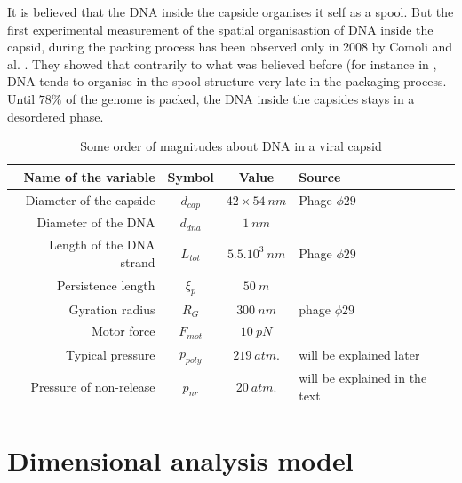 \documentclass{article}
\begin{document}
It is believed that the DNA inside the capside organises it self as a spool. But the first experimental measurement of the spatial organisastion of DNA inside the capsid, during the packing process has been observed only in 2008 by Comoli and al. \cite{comoli2008}. They showed that contrarily to what was believed before (for instance in \cite{phillips2005, prohit2005}, DNA tends to organise in the spool structure very late in the packaging process. Until $78\%$ of the genome is packed, the DNA inside the capsides stays in a desordered phase.

\begin{table}[h]
    \centering
    \begin{tabular}{|| r | c | c | l ||}
        \hline \hline
        \textbf{Name of the variable} & \textbf{Symbol} & \textbf{Value} & \textbf{Source} \\
        \hline \hline
        Diameter of the capside  & $d_{cap}$   & $42\times 54~nm$ & Phage $\phi29$ \cite{tao1998}  \\
        Diameter of the DNA    & $ d_{dna}$  & $1~nm$           & \cite{phillips2005} \\
        Length of the DNA strand & $ L_{tot}$  & $5.5.10^{3}~nm$  & Phage $\phi29$ \cite{tao1998} \\
        Persistence length       & $ \xi_p $   & $50~m$           & \cite{smith2001} \\
        Gyration radius          & $ R_{G} $     & $300~nm$         & phage $\phi29$ \cite{phillips2005} \\
        Motor force              & $ F_{mot}$  & $10~pN$          & \cite{phillips2005} \\
        Typical pressure         & $ p_{poly}$ & $219~atm.$       & will be explained later \\
        Pressure of non-release  & $ p_{nr} $  & $20~atm.$        & will be explained in the text \\
        \hline \hline
    \end{tabular}
    \caption{Some order of magnitudes about DNA in a viral capsid}
    \label{tab:figures}
\end{table}

\section{Dimensional analysis model}
\end{document}

